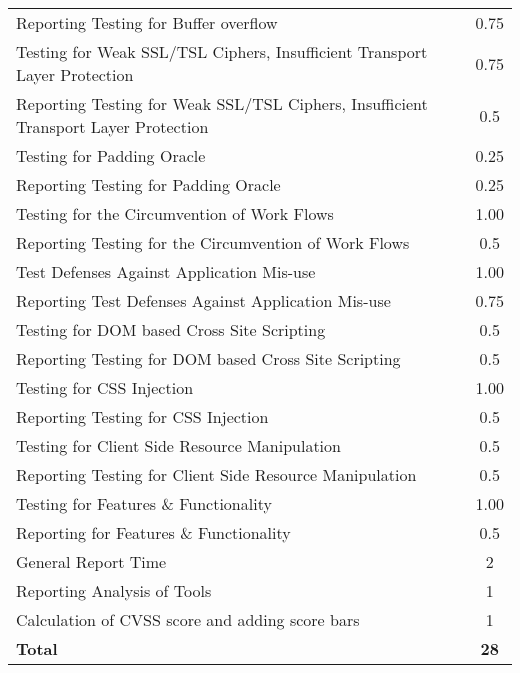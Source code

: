 \begin{table}[H]
\begin{tabular*}{\textwidth}{@{\extracolsep{\fill}} l c@{\extracolsep{0pt}} }
Reporting Testing for Buffer overflow       & 0.75 \\
Testing for Weak SSL/TSL Ciphers, Insufficient Transport Layer Protection & 0.75 \\
Reporting Testing for Weak SSL/TSL Ciphers, Insufficient Transport Layer Protection & 0.5 \\
Testing for Padding Oracle					& 0.25 \\
Reporting Testing for Padding Oracle 		& 0.25 \\
Testing for the Circumvention of Work Flows	& 1.00 \\
Reporting Testing for the Circumvention of Work Flows & 0.5 \\
Test Defenses Against Application Mis-use	& 1.00 \\
Reporting Test Defenses Against Application Mis-use & 0.75 \\
Testing for DOM based Cross Site Scripting	& 0.5 \\
Reporting Testing for DOM based Cross Site Scripting & 0.5 \\
Testing for CSS Injection					& 1.00 \\
Reporting Testing for CSS Injection         & 0.5 \\
Testing for Client Side Resource Manipulation & 0.5 \\
Reporting Testing for Client Side Resource Manipulation & 0.5 \\
Testing for Features \& Functionality       & 1.00 \\
Reporting for Features \& Functionality     & 0.5 \\
General Report Time							& 2 \\
Reporting Analysis of Tools                 & 1 \\
Calculation of CVSS score and adding score bars & 1 \\ \hline\hline
\textbf{Total}								& \textbf{28}
\end{tabular*}
\end{table}